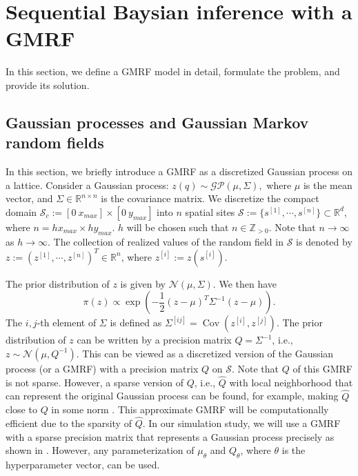 \documentclass[letterpaper, 10 pt, conference]{ieeeconf}
\newcommand{\set}[1]{\{#1\}} \newcommand{\norm}[1]{\|#1\|}
\newcommand{\mc}[1]{\mathcal{#1}} \newcommand{\mb}[1]{\mathbf{#1}}
\newcommand{\Cov}{\operatorname{Cov}}
\newcommand{\Real}{\mathbb{R}}
\newcommand{\ZPlus}{\mathbb{Z}_{>0}}
\newcommand{\Normal}{\mc{N}}
\newcommand{\f}[2]{f_{#1}\left(#2\right)}
\newcommand{\K}{\Sigma}
\begin{document}
\section{Sequential Baysian inference with a GMRF} \label{sec:Sequential Baysian}
In this section,  we define  a GMRF model in detail, formulate the problem, and provide its solution. 


\subsection{Gaussian processes and Gaussian Markov random fields}\label{sec:GP-GMRF}
In this section, we briefly introduce a GMRF as a discretized Gaussian process on a lattice.
Consider a Gaussian process: $z(q) \sim \mc{GP}(\mu, \Sigma),$ where $\mu$ is the mean vector, and $\Sigma \in \Real^{n \times n}$ is the covariance matrix. We discretize the compact domain $\mc{S}_c := [0 ~ x_{max}] \times [0 ~ y_{max}]$ into $n$ spatial sites $\mc{S}:= \set{s^{[1]},\cdots,s^{[n]}} \subset \Real^d$, where $n = h x_{max} \times h y_{max}$. $h$ will be chosen such that $n \in \ZPlus$.
Note that $n \rightarrow \infty$ as $h \rightarrow \infty.$ The collection of realized values of the random field in $\mc{S}$ is denoted by $z := (z^{[1]},\cdots,z^{[n]})^T \in \Real^{n}$, where $z^{[i]} :=z(s^{[i]})$.

The prior distribution of $z$ is given by $\Normal(\mu,\Sigma)$. We then  have 
\begin{equation}
 \pi(z) \propto \exp \left( -\frac{1}{2} \left(z - \mu\right)^T \Sigma^{-1} \left(z - \mu\right) \right).
\label{eq:z_prob}
\end{equation}
The $i,j$-th element of $\Sigma$ is defined as $\Sigma^{[ij]} = \Cov(z^{[i]},z^{[j]}).$ %
The prior distribution of $z$ can be written by a precision matrix $Q=\Sigma^{-1}$, i.e., $z \sim \Normal(\mu,Q^{-1})$.
This can be viewed as a discretized version of the Gaussian process (or a GMRF) with a precision matrix $Q$ on $\mc{S}.$ Note that $Q$ of this GMRF is not sparse. However, a sparse version of $Q$, i.e., $\hat Q$ with local neighborhood that can represent the original Gaussian process can be found, for example, making $\hat Q$ close to $Q$ in some norm \cite{rue:2002,cressie:2008,hartman:2008}. 
This approximate GMRF will be computationally efficient due to the sparsity of $\hat Q$. 
In our simulation study, we will use a GMRF with a sparse precision matrix that represents a Gaussian process precisely as shown in \cite{lindgren:2011,jadaliha2012efficient}. However, any parameterization of $\mu_\theta$ and $Q_\theta$, where $\theta$ is the hyperparameter vector, can be used. 
\end{document}
